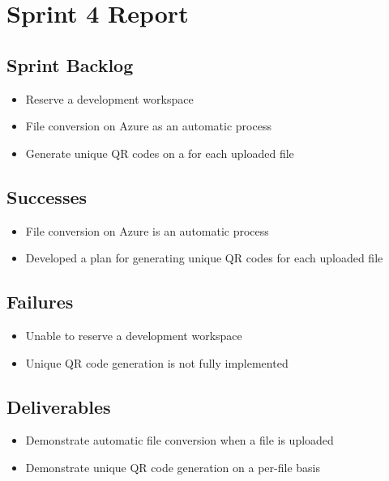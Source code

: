
\section{Sprint 4 Report}
\label{sec:Sprint4_report}
    \subsection{Sprint Backlog}
    \label{sec:Sprint4_backlog}
        \begin{itemize}
            \item Reserve a development workspace
            \item File conversion on Azure as an automatic process
            \item Generate unique QR codes on a for each uploaded file
        \end{itemize}

    \subsection{Successes}
    \label{sec:Sprint4_successes}
        \begin{itemize}
            \item File conversion on Azure is an automatic process
            \item Developed a plan for generating unique QR codes for each uploaded file
        \end{itemize}

    \subsection{Failures}
    \label{sec:Sprint4_failures}
        \begin{itemize}
            \item Unable to reserve a development workspace
            \item Unique QR code generation is not fully implemented 
        \end{itemize}

    \subsection{Deliverables}
    \label{sec:Sprint4_deliverables}
    \begin{itemize}
        \item Demonstrate automatic file conversion when a file is uploaded
        \item Demonstrate unique QR code generation on a per-file basis
    \end{itemize}

